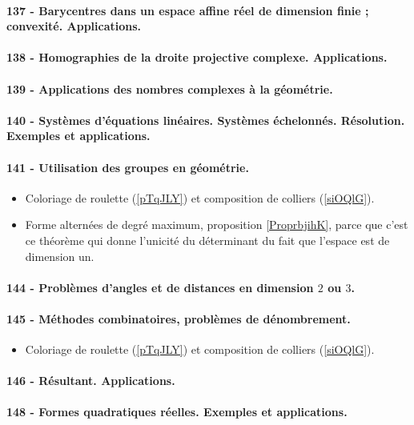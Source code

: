 \paragraph{137 - Barycentres dans un espace affine réel de dimension finie ; convexité. Applications.}
\paragraph{138 - Homographies de la droite projective complexe. Applications.}
\paragraph{139 - Applications des nombres complexes à la géométrie.}
\paragraph{140 - Systèmes d’équations linéaires. Systèmes échelonnés. Résolution. Exemples et applications.}
\paragraph{141 - Utilisation des groupes en géométrie.}
\begin{itemize}
    \item Coloriage de roulette (\ref{pTqJLY}) et composition de colliers (\ref{siOQlG}).
    \item Forme alternées de degré maximum, proposition \ref{ProprbjihK}, parce que c'est ce théorème qui donne l'unicité du déterminant du fait que l'espace est de dimension un.
\end{itemize}
\paragraph{144 - Problèmes d’angles et de distances en dimension $2$ ou $3$.}
\paragraph{145 - Méthodes combinatoires, problèmes de dénombrement.}
\begin{itemize}
    \item Coloriage de roulette (\ref{pTqJLY}) et composition de colliers (\ref{siOQlG}).
\end{itemize}
\paragraph{146 - Résultant. Applications.}
\paragraph{148 - Formes quadratiques réelles. Exemples et applications.}
